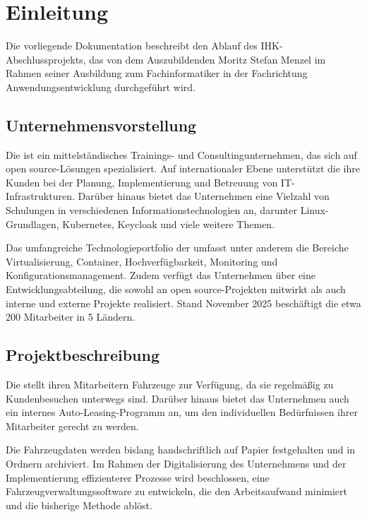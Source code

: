 
\section{Einleitung}

Die vorliegende Dokumentation beschreibt den Ablauf des IHK-Abschlussprojekts, das von dem Auszubildenden Moritz Stefan Menzel im Rahmen seiner Ausbildung zum Fachinformatiker in der Fachrichtung Anwendungsentwicklung durchgeführt wird.

\subsection{Unternehmensvorstellung}

Die \beins{} ist ein mittelständisches Trainings- und Consultingunternehmen, das sich auf \gls{open source}-Lösungen spezialisiert. Auf internationaler Ebene unterstützt die \beins{} ihre Kunden bei der Planung, Implementierung und Betreuung von IT-Infrastrukturen. Darüber hinaus bietet das Unternehmen eine Vielzahl von Schulungen in verschiedenen Informationstechnologien an, darunter Linux-Grundlagen, Kubernetes, Keycloak und viele weitere Themen.

Das umfangreiche Technologieportfolio der \beins{} umfasst unter anderem die Bereiche Virtualisierung, Container, Hochverfügbarkeit, Monitoring und Konfigurationsmanagement. Zudem verfügt das Unternehmen über eine Entwicklungsabteilung, die sowohl an \gls{open source}-Projekten mitwirkt als auch interne und externe Projekte realisiert.
Stand November 2025 beschäftigt die \beins{} etwa 200 Mitarbeiter in 5 Ländern.

\subsection{Projektbeschreibung}

Die \beins{} stellt ihren Mitarbeitern Fahrzeuge zur Verfügung, da sie regelmäßig zu Kundenbesuchen unterwegs sind. Darüber hinaus bietet das Unternehmen auch ein internes Auto-Leasing-Programm an, um den individuellen Bedürfnissen ihrer Mitarbeiter gerecht zu werden.

Die Fahrzeugdaten werden bislang handschriftlich auf Papier festgehalten und in Ordnern archiviert. Im Rahmen der Digitalisierung des Unternehmens und der Implementierung effizienterer Prozesse wird beschlossen, eine Fahrzeugverwaltungssoftware zu entwickeln, die den Arbeitsaufwand minimiert und die bisherige Methode ablöst.

